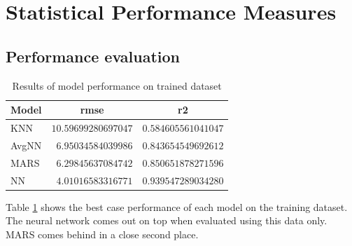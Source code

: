 \documentclass[letterpaper,12pt,titlepage,oneside,final]{report}
\begin{document}
    \section{Statistical Performance Measures}

        \subsection {Performance evaluation}
            \begin{table}[!hp]
                \begin{center}
                \begin{tabular}{lrr}
                \hline\hline
                \multicolumn{1}{l}{Model}&\multicolumn{1}{c}{rmse}&\multicolumn{1}{c}{r2}\tabularnewline
                \hline
                KNN&$10.59699280697047$&$0.584605561041047$\tabularnewline
                AvgNN&$ 6.95034584039986$&$0.843654549692612$\tabularnewline
                MARS&$ 6.29845637084742$&$0.850651878271596$\tabularnewline
                NN&$ 4.01016583316771$&$0.939547289034280$\tabularnewline
                \hline
                \end{tabular}
                \caption{Results of model performance on trained dataset}
                \label{train-res}
                \end{center}

            \end{table}
            Table \ref{train-res} shows the best case performance of each model on the training dataset. The neural network comes out on top when evaluated using this data only. MARS comes behind in a close second place. 
\end{document}
